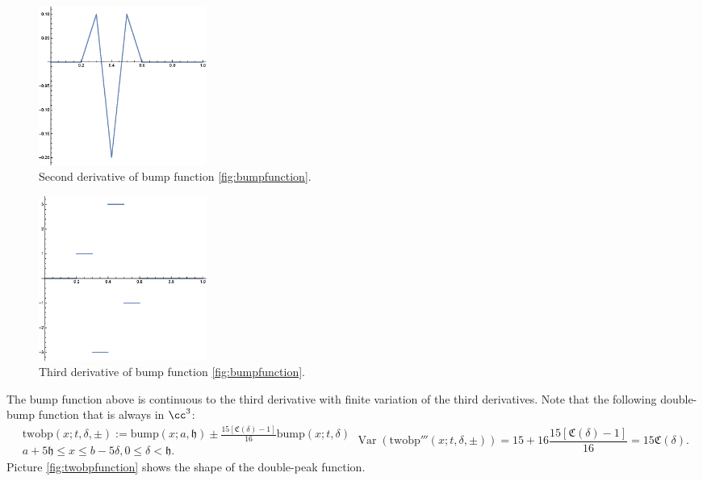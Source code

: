 \documentclass{iitthesis}
\DeclareMathOperator{\Var}{Var}
\theoremstyle{definition}
\theoremstyle{remark}
\begin{document}
\begin{figure}[ht]
\centering
\includegraphics[width=5.5cm]{bumpp2.eps}
\caption{Second derivative of bump function \ref{fig:bumpfunction}. \label{fig:bumpp2}}
\end{figure}
\begin{figure}[ht]
\centering
\includegraphics[width=5.5cm]{bumpp3.eps}
\caption{Third derivative of bump function \ref{fig:bumpfunction}. \label{fig:bumpp3}}
\end{figure}
The bump function above is continuous to the third derivative with finite variation of the third derivatives. Note that the following double-bump function that is always in $\cc^3$:
\begin{subequations}
    \begin{multline}\label{foolingfunctionsim}
        \text{twobp}(x;t,\delta,\pm):=\text{bump}(x;a,\mathfrak{h})\pm\frac{15[\mathfrak{C}(\delta)-1]}{16}\text{bump}(x;t,\delta)\\ a+5\mathfrak{h}\le x \le b-5\delta, 0\le \delta <\mathfrak{h}.
    \end{multline}
    \begin{equation}
        \Var(\text{twobp}'''(x;t,\delta,\pm))=15+16\frac{15[\mathfrak{C}(\delta)-1]}{16}=15\mathfrak{C}(\delta).
    \end{equation}
\end{subequations}
Picture \ref{fig:twobpfunction} shows the shape of the double-peak function.
\end{document}
